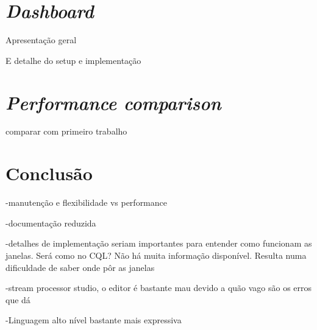 \documentclass[article]{IEEEtran}
\begin{document}
\section{\textit{Dashboard}} 
		Apresentação geral
		
		E detalhe do setup e implementação 
		
\section{\textit{Performance comparison}} 
comparar com primeiro trabalho
		
\section{Conclusão} 
-manutenção e flexibilidade vs performance

-documentação reduzida

-detalhes de implementação seriam importantes para entender como funcionam as janelas. Será como no CQL? Não há muita informação disponível. Resulta numa dificuldade de saber onde pôr as janelas

-stream processor studio, o editor é bastante mau devido a quão vago são os erros que dá

-Linguagem alto nível bastante mais expressiva







\end{document}
